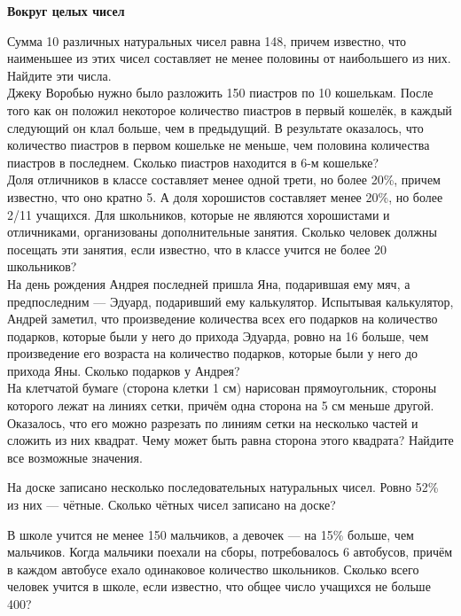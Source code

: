 \centerline{\bf \Huge Вокруг целых чисел}

 Сумма 10 различных натуральных чисел равна 148,
причем известно, что наименьшее из этих чисел составляет не менее половины от наибольшего из них. Найдите эти числа.\\

 Джеку Воробью нужно было разложить 150 пиастров по 10 кошелькам. После того как он положил некоторое количество пиастров в первый
кошелёк, в каждый следующий он клал больше, чем в предыдущий. В результате оказалось,
что количество пиастров в первом кошельке не меньше, чем половина количества пиастров
в последнем. Сколько пиастров находится в 6-м кошельке?\\

 Доля отличников в классе составляет менее
одной трети, но более 20\%, причем известно, что оно кратно 5. А доля хорошистов составляет
менее 20\%, но более 2/11 учащихся. Для школьников, которые не являются хорошистами и
отличниками, организованы дополнительные занятия. Сколько человек должны посещать эти
занятия, если известно, что в классе учится не более 20 школьников?\\


 На день рождения Андрея последней пришла Яна, подарившая
ему мяч, а предпоследним — Эдуард, подаривший ему калькулятор. Испытывая калькулятор,
Андрей заметил, что произведение количества всех его подарков на количество подарков, которые были у него до прихода Эдуарда, ровно на 16 больше, чем произведение его возраста на
количество подарков, которые были у него до прихода Яны. Сколько подарков у Андрея?\\

 На клетчатой бумаге (сторона клетки 1 см) нарисован прямоугольник, стороны которого лежат на линиях сетки, причём одна сторона на 5 см меньше другой. Оказалось, что его можно разрезать по линиям сетки на несколько частей и сложить из них квадрат. Чему может быть равна сторона этого квадрата? Найдите все возможные значения.

  На доске записано несколько последовательных натуральных
чисел. Ровно 52\% из них — чётные. Сколько чётных чисел записано на доске?

  В школе учится не менее 150 мальчиков, а девочек —
на 15\% больше, чем мальчиков. Когда мальчики поехали на сборы, потребовалось 6 автобусов,
причём в каждом автобусе ехало одинаковое количество школьников. Сколько всего человек
учится в школе, если известно, что общее число учащихся не больше 400?\\


